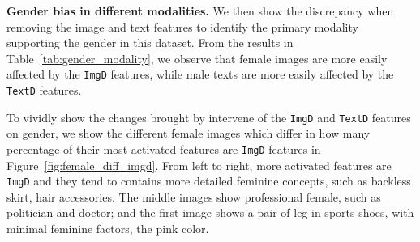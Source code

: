 \begin{table}[h]
\centering
\caption{\footnotesize Probability over the original gender label for different input modality. The results show that after removing the modality dominant features, e.g., \texttt{ImgDom} for the input in the same modality, e.g., image, the original inputs will be affected in a larger extent, i.e., 0.785 compared to 0.828 caused by removing \texttt{TextDom} features.}
{}
    \label{tab:gender_case}
\end{table}

\textbf{Gender bias in different modalities.} We then show the discrepancy when removing the image and text features to identify the primary modality supporting the gender in this dataset. From the results in Table~\ref{tab:gender_modality}, we observe that female images are more easily affected by the \texttt{ImgD} features, while male texts are more easily affected by the \texttt{TextD} features.
\begin{table}[h]
    \centering
    \caption{\footnotesize Comparison of the effects of removing different modality-feature from the specific gender in the corresponding modality. For \textit{female}, remove the \texttt{ImgD} lead to larger changes to the female visual inputs, than remove the \texttt{TextD} from the female textual inputs, vice versa for male.}
    \label{tab:gender_modality}
\end{table}

To vividly show the changes brought by intervene of the \texttt{ImgD} and \texttt{TextD} features on gender, we show the different female images which differ in how many percentage of their most activated features are \texttt{ImgD} features in Figure~\ref{fig:female_diff_imgd}. From left to right, more activated features are \texttt{ImgD} and they tend to contains more detailed feminine concepts, such as backless skirt, hair accessories. 
The middle images show professional female, such as politician and doctor; and the first image shows a pair of leg in sports shoes, with minimal feminine factors, the pink color. 


